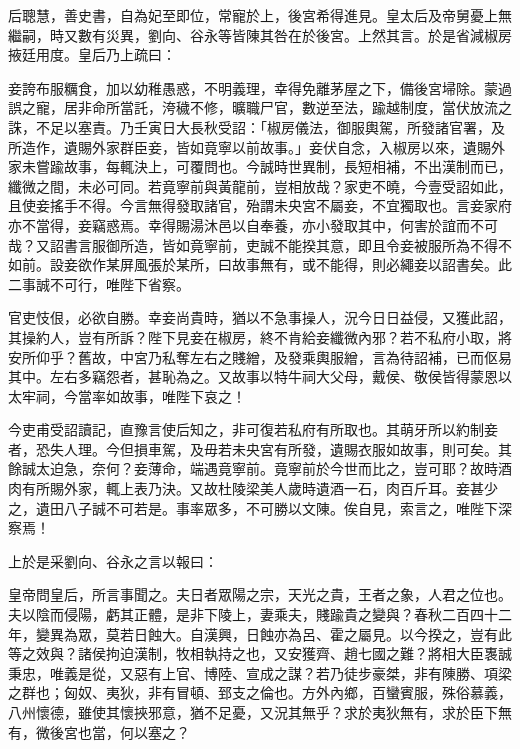 \begin{pinyinscope}
后聰慧，善史書，自為妃至即位，常寵於上，後宮希得進見。皇太后及帝舅憂上無繼嗣，時又數有災異，劉向、谷永等皆陳其咎在於後宮。上然其言。於是省減椒房掖廷用度。皇后乃上疏曰：

妾誇布服糲食，加以幼稚愚惑，不明義理，幸得免離茅屋之下，備後宮埽除。蒙過誤之寵，居非命所當託，洿穢不修，曠職尸官，數逆至法，踰越制度，當伏放流之誅，不足以塞責。乃壬寅日大長秋受詔：「椒房儀法，御服輿駕，所發諸官署，及所造作，遺賜外家群臣妾，皆如竟寧以前故事。」妾伏自念，入椒房以來，遺賜外家未嘗踰故事，每輒決上，可覆問也。今誠時世異制，長短相補，不出漢制而已，纖微之間，未必可同。若竟寧前與黃龍前，豈相放哉？家吏不曉，今壹受詔如此，且使妾搖手不得。今言無得發取諸官，殆謂未央宮不屬妾，不宜獨取也。言妾家府亦不當得，妾竊惑焉。幸得賜湯沐邑以自奉養，亦小發取其中，何害於誼而不可哉？又詔書言服御所造，皆如竟寧前，吏誠不能揆其意，即且令妾被服所為不得不如前。設妾欲作某屏風張於某所，曰故事無有，或不能得，則必繩妾以詔書矣。此二事誠不可行，唯陛下省察。

官吏忮佷，必欲自勝。幸妾尚貴時，猶以不急事操人，況今日日益侵，又獲此詔，其操約人，豈有所訴？陛下見妾在椒房，終不肯給妾纖微內邪？若不私府小取，將安所仰乎？舊故，中宮乃私奪左右之賤繒，及發乘輿服繒，言為待詔補，已而伛易其中。左右多竊怨者，甚恥為之。又故事以特牛祠大父母，戴侯、敬侯皆得蒙恩以太牢祠，今當率如故事，唯陛下哀之！

今吏甫受詔讀記，直豫言使后知之，非可復若私府有所取也。其萌牙所以約制妾者，恐失人理。今但損車駕，及毋若未央宮有所發，遺賜衣服如故事，則可矣。其餘誠太迫急，奈何？妾薄命，端遇竟寧前。竟寧前於今世而比之，豈可耶？故時酒肉有所賜外家，輒上表乃決。又故杜陵梁美人歲時遺酒一石，肉百斤耳。妾甚少之，遺田八子誠不可若是。事率眾多，不可勝以文陳。俟自見，索言之，唯陛下深察焉！

上於是采劉向、谷永之言以報曰：

皇帝問皇后，所言事聞之。夫日者眾陽之宗，天光之貴，王者之象，人君之位也。夫以陰而侵陽，虧其正體，是非下陵上，妻乘夫，賤踰貴之變與？春秋二百四十二年，變異為眾，莫若日蝕大。自漢興，日蝕亦為呂、霍之屬見。以今揆之，豈有此等之效與？諸侯拘迫漢制，牧相執持之也，又安獲齊、趙七國之難？將相大臣褢誠秉忠，唯義是從，又惡有上官、博陸、宣成之謀？若乃徒步豪桀，非有陳勝、項梁之群也；匈奴、夷狄，非有冒頓、郅支之倫也。方外內鄉，百蠻賓服，殊俗慕義，八州懷德，雖使其懷挾邪意，猶不足憂，又況其無乎？求於夷狄無有，求於臣下無有，微後宮也當，何以塞之？


\end{pinyinscope}
